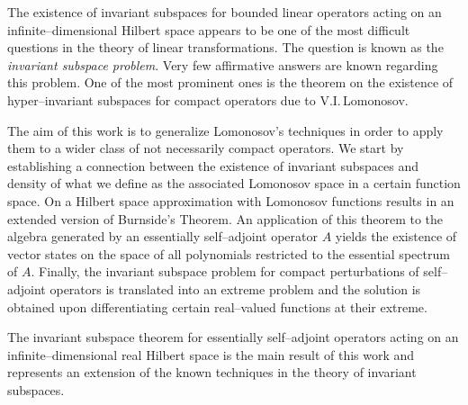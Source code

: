 


The existence of invariant subspaces for bounded linear
operators acting on an infinite--dimensional Hilbert space
appears to be one of the most difficult questions in the theory
of linear transformations. The question is known as the {\em
invariant subspace problem}. Very few affirmative answers are
known regarding this problem. One of the most prominent ones is
the theorem on the existence of hyper--invariant subspaces for
compact operators due to V.I.\,Lomonosov.

\smallskip

The aim of this work is to generalize Lomonosov's techniques in
order to apply them to a wider class of not necessarily compact
operators. We start by establishing a connection between the
existence of invariant subspaces and density of what we define
as the associated Lomonosov space in a certain function space.
On a Hilbert space approximation with Lomonosov functions
results in an extended version of Burnside's Theorem. An
application of this theorem to the algebra generated by an
essentially self--adjoint operator $A$ yields the existence of
vector states on the space of all polynomials restricted to the
essential spectrum of $A$. Finally, the invariant subspace
problem for compact perturbations of self--adjoint operators is
translated into an extreme problem and the solution is obtained
upon differentiating certain real--valued functions at their
extreme.

\smallskip

The invariant subspace theorem for essentially self--adjoint
operators acting on an infinite--dimensional real Hilbert space
is the main result of this work and represents an extension of
the known techniques in the theory of invariant subspaces.

